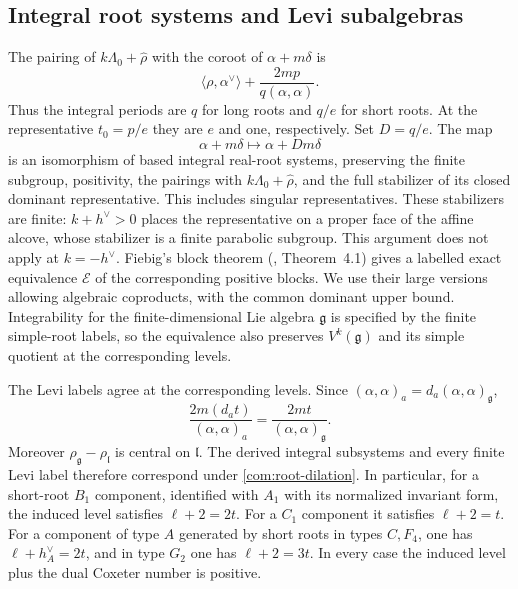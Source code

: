 \documentclass[11pt,a4paper]{amsart}
\numberwithin{equation}{section}
\theoremstyle{definition}
\theoremstyle{remark}
\newcommand{\g}{\mathfrak g}
\newcommand{\lev}{\mathfrak l}
\begin{document}
\subsection{Integral root systems and Levi subalgebras}
The pairing of $k\Lambda_0+\widehat\rho$ with the coroot of
$\alpha+m\delta$ is
\begin{equation}\label{com:integral-pairing}
 \langle\rho,\alpha^\vee\rangle+
                    \frac{2mp}{q(\alpha,\alpha)}.
\end{equation}
Thus the integral periods are $q$ for long roots and $q/e$ for
short roots. At the representative $t_0=p/e$ they are $e$ and one,
respectively. Set $D=q/e$. The map
\begin{equation}\label{com:root-dilation}
 \alpha+m\delta\longmapsto\alpha+Dm\delta
\end{equation}
is an isomorphism of based integral real-root systems, preserving the
finite subgroup, positivity, the pairings with $k\Lambda_0+\widehat\rho$, and the
full stabilizer of its closed dominant representative. This includes
singular representatives. These stabilizers are finite: $k+h^\vee>0$ places the representative on a proper face of the affine alcove,
whose stabilizer is a finite parabolic subgroup. This argument does not apply at $k=-h^\vee$. Fiebig's block theorem
(\cite{Fiebig}, Theorem~4.1) gives a labelled exact equivalence
$\mathcal E$ of the corresponding positive blocks. We use their
large versions allowing algebraic coproducts, with the common dominant
upper bound. Integrability for the finite-dimensional Lie algebra $\g$ is specified
by the finite simple-root labels, so the equivalence also preserves
$V^k(\g)$ and its simple quotient at the corresponding levels.

The Levi labels agree at the corresponding levels. Since
$(\alpha,\alpha)_a=d_a(\alpha,\alpha)_\g$,
$$
 \frac{2m(d_at)}{(\alpha,\alpha)_a}
       =\frac{2mt}{(\alpha,\alpha)_\g}.
$$
Moreover $\rho_\g-\rho_\lev$ is central on $\lev$.
The derived integral subsystems and every finite Levi label therefore
correspond under \eqref{com:root-dilation}. In particular, for a short-root $B_1$ component, identified with
$A_1$ with its normalized invariant form, the induced level satisfies
$\ell+2=2t$. For a $C_1$ component it satisfies $\ell+2=t$.
For a component of type $A$ generated by short roots in types $C,F_4$,
one has $\ell+h^\vee_{A}=2t$, and in type $G_2$ one has
$\ell+2=3t$. In every case the induced level plus the dual Coxeter number is positive.
\end{document}
